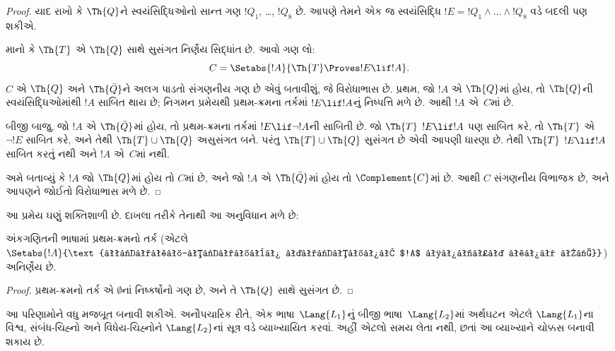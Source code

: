 \begin{proof}
યાદ રાખો કે $\Th{Q}$ને
સ્વયંસિદ્ધિઓનો સાન્ત ગણ
$!Q_1$, \dots,
$!Q_8$ છે. આપણે તેમને
એક જ સ્વયંસિદ્ધિ
$!E = !Q_1 \land
\dots \land !Q_8$ વડે
બદલી પણ શકીએ.

માનો કે $\Th{T}$ એ
$\Th{Q}$ સાથે સુસંગત
નિર્ણેય સિદ્ધાંત છે.
આવો ગણ લો:
\[
C = \Setabs{!A}{\Th{T} \Proves !E \lif !A}.
\]
$C$ એ $\Th{Q}$ અને
$\Th{\bar Q}$ને અલગ પાડતો
સંગણનીય ગણ છે એવું બતાવીશું,
જે વિરોધાભાસ છે. પ્રથમ,
જો $!A$ એ $\Th{Q}$માં
હોય, તો $\Th{Q}$ની
સ્વયંસિદ્ધિઓમાંથી $!A$
સાબિત થાય છે; નિગમન
પ્રમેયથી પ્રથમ-ક્રમના
તર્કમાં $!E \lif !A$નું
નિષ્પત્તિ મળે છે.
આથી $!A$ એ~$C$માં છે.

બીજી બાજુ, જો $!A$ એ
$\Th{\bar Q}$માં હોય,
તો પ્રથમ-ક્રમના તર્કમાં
$!E \lif \lnot !A$ની
સાબિતી છે. જો $\Th{T}$
$!E \lif !A$ પણ સાબિત
કરે, તો $\Th{T}$ એ
$\lnot !E$ સાબિત કરે,
અને તેથી $\Th{T}
\cup \Th{Q}$ અસુસંગત બને.
પરંતુ $\Th{T} \cup \Th{Q}$
સુસંગત છે એવી આપણી
ધારણા છે. તેથી $\Th{T}$
$!E \lif !A$ સાબિત કરતું
નથી અને $!A$ એ~$C$માં
નથી.

અમે બતાવ્યું કે $!A$ જો
$\Th{Q}$માં હોય તો $C$માં
છે, અને જો $!A$ એ
$\Th{\bar Q}$માં હોય તો
$\Complement{C}$માં છે.
આથી $C$ સંગણનીય વિભાજક
છે, અને આપણને જોઈતો
વિરોધાભાસ મળે છે.
\end{proof}

આ પ્રમેય ઘણું શક્તિશાળી છે.
દાખલા તરીકે તેનાથી આ
અનુવિધાન મળે છે:

\begin{cor}
  અંકગણિતની ભાષામાં
  પ્રથમ-ક્રમનો તર્ક (એટલે
  $\Setabs{!A}{\text{પ્રથમ-ક્રમના તર્કમાં $!A$ સાબિત થાય છે}}$)
  અનિર્ણેય છે.
\end{cor}

\begin{proof}
પ્રથમ-ક્રમનો તર્ક એ
$\emptyset$નાં નિષ્કર્ષોનો
ગણ છે, અને તે
$\Th{Q}$ સાથે સુસંગત છે.
\end{proof}
\endgroup


\begingroup
\makeatletter{}\makeatother


\label{guunit:OLP-0311}


આ પરિણામોને વધુ મજબૂત
બનાવી શકીએ. અનૌપચારિક રીતે,
એક ભાષા~$\Lang{L_1}$નું
બીજી ભાષા~$\Lang{L_2}$માં
અર્થઘટન એટલે
$\Lang{L_1}$ના વિશ્વ,
સંબંધ-ચિહ્નો અને
વિધેય-ચિહ્નોને
$\Lang{L_2}$નાં
સૂત્ર વડે વ્યાખ્યાયિત
કરવાં. અહીં એટલો સમય
લેતા નથી, છતાં આ
વ્યાખ્યાને ચોક્કસ બનાવી
શકાય છે.

